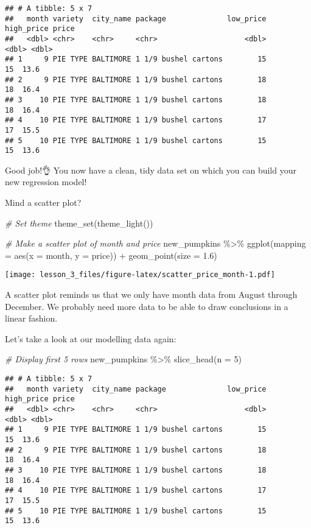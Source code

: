 \documentclass[
]{article}
\newenvironment{Shaded}{\begin{snugshade}}{\end{snugshade}}
\newcommand{\AttributeTok}[1]{\textcolor[rgb]{0.77,0.63,0.00}{#1}}
\newcommand{\CommentTok}[1]{\textcolor[rgb]{0.56,0.35,0.01}{\textit{#1}}}
\newcommand{\DecValTok}[1]{\textcolor[rgb]{0.00,0.00,0.81}{#1}}
\newcommand{\FloatTok}[1]{\textcolor[rgb]{0.00,0.00,0.81}{#1}}
\newcommand{\FunctionTok}[1]{\textcolor[rgb]{0.00,0.00,0.00}{#1}}
\newcommand{\NormalTok}[1]{#1}
\newcommand{\SpecialCharTok}[1]{\textcolor[rgb]{0.00,0.00,0.00}{#1}}
\begin{document}
\begin{verbatim}
## # A tibble: 5 x 7
##   month variety  city_name package              low_price high_price price
##   <dbl> <chr>    <chr>     <chr>                    <dbl>      <dbl> <dbl>
## 1     9 PIE TYPE BALTIMORE 1 1/9 bushel cartons        15         15  13.6
## 2     9 PIE TYPE BALTIMORE 1 1/9 bushel cartons        18         18  16.4
## 3    10 PIE TYPE BALTIMORE 1 1/9 bushel cartons        18         18  16.4
## 4    10 PIE TYPE BALTIMORE 1 1/9 bushel cartons        17         17  15.5
## 5    10 PIE TYPE BALTIMORE 1 1/9 bushel cartons        15         15  13.6
\end{verbatim}

Good job!👌 You now have a clean, tidy data set on which you can build
your new regression model!

Mind a scatter plot?

\begin{Shaded}
\begin{Highlighting}[]
\CommentTok{\# Set theme}
\FunctionTok{theme\_set}\NormalTok{(}\FunctionTok{theme\_light}\NormalTok{())}

\CommentTok{\# Make a scatter plot of month and price}
\NormalTok{new\_pumpkins }\SpecialCharTok{\%\textgreater{}\%} 
  \FunctionTok{ggplot}\NormalTok{(}\AttributeTok{mapping =} \FunctionTok{aes}\NormalTok{(}\AttributeTok{x =}\NormalTok{ month, }\AttributeTok{y =}\NormalTok{ price)) }\SpecialCharTok{+}
  \FunctionTok{geom\_point}\NormalTok{(}\AttributeTok{size =} \FloatTok{1.6}\NormalTok{)}
\end{Highlighting}
\end{Shaded}

\texttt{[image: lesson\_3\_files/figure-latex/scatter\_price\_month-1.pdf]}

A scatter plot reminds us that we only have month data from August
through December. We probably need more data to be able to draw
conclusions in a linear fashion.

Let's take a look at our modelling data again:

\begin{Shaded}
\begin{Highlighting}[]
\CommentTok{\# Display first 5 rows}
\NormalTok{new\_pumpkins }\SpecialCharTok{\%\textgreater{}\%} 
  \FunctionTok{slice\_head}\NormalTok{(}\AttributeTok{n =} \DecValTok{5}\NormalTok{)}
\end{Highlighting}
\end{Shaded}

\begin{verbatim}
## # A tibble: 5 x 7
##   month variety  city_name package              low_price high_price price
##   <dbl> <chr>    <chr>     <chr>                    <dbl>      <dbl> <dbl>
## 1     9 PIE TYPE BALTIMORE 1 1/9 bushel cartons        15         15  13.6
## 2     9 PIE TYPE BALTIMORE 1 1/9 bushel cartons        18         18  16.4
## 3    10 PIE TYPE BALTIMORE 1 1/9 bushel cartons        18         18  16.4
## 4    10 PIE TYPE BALTIMORE 1 1/9 bushel cartons        17         17  15.5
## 5    10 PIE TYPE BALTIMORE 1 1/9 bushel cartons        15         15  13.6
\end{verbatim}
\end{document}
